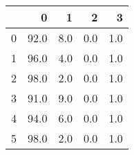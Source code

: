 \begin{tabular}{lrrrr}
\toprule
{} &     0 &    1 &    2 &    3 \\
\midrule
0 &  92.0 &  8.0 &  0.0 &  1.0 \\
1 &  96.0 &  4.0 &  0.0 &  1.0 \\
2 &  98.0 &  2.0 &  0.0 &  1.0 \\
3 &  91.0 &  9.0 &  0.0 &  1.0 \\
4 &  94.0 &  6.0 &  0.0 &  1.0 \\
5 &  98.0 &  2.0 &  0.0 &  1.0 \\
\bottomrule
\end{tabular}
